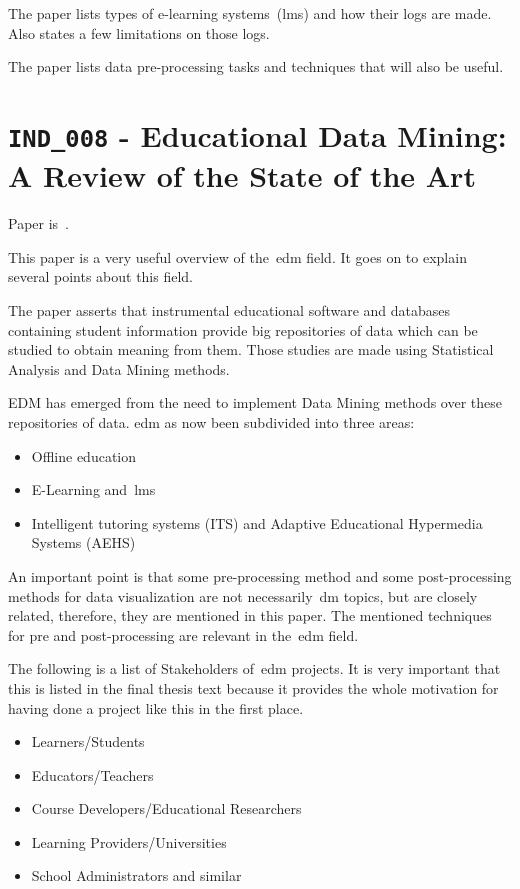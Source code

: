 The paper lists types of e-learning systems~(\gls{lms}) and how their logs are
made. Also states a few limitations on those logs.

The paper lists data pre-processing tasks and techniques that will also be
useful.

\section{\texttt{IND\_008} - Educational Data Mining: A Review of the State of
the Art}

Paper is~\cite{ind_008}.

This paper is a very useful overview of the~\gls{edm} field. It goes on to
explain several points about this field.

The paper asserts that instrumental educational software and databases
containing student information provide big repositories of data which can be
studied to obtain meaning from them. Those studies are made using Statistical
Analysis and Data Mining methods.

EDM has emerged from the need to implement Data Mining methods over these
repositories of data. \gls{edm} as now been subdivided into three areas:

\begin{itemize}
    \item Offline education
    \item E-Learning and~\gls{lms}
    \item Intelligent tutoring systems (ITS) and Adaptive Educational
        Hypermedia Systems (AEHS)
\end{itemize}

An important point is that some pre-processing method and some post-processing
methods for data visualization are not necessarily~\gls{dm} topics, but are
closely related, therefore, they are mentioned in this paper. The mentioned
techniques for pre and post-processing are relevant in the~\gls{edm} field.

The following is a list of Stakeholders of~\gls{edm} projects. It is very
important that this is listed in the final thesis text because it provides the
whole motivation for having done a project like this in the first place.

\begin{itemize}
    \item Learners/Students
    \item Educators/Teachers
    \item Course Developers/Educational Researchers
    \item Learning Providers/Universities
    \item School Administrators and similar
\end{itemize}

